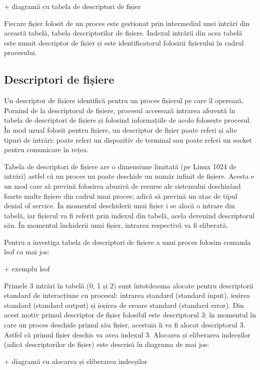 + diagramă cu tabela de descriptori de fișier

Fiecare fișier folosit de un proces este gestionat prin intermediul unei intrări
din această tabelă, tabela descriptorilor de fișiere. Indexul intrării din acea
tabelă este numit descriptor de fișier și este identificatorul folosirii
fișierului în cadrul procesului.

\subsection{Descriptori de fișiere}

Un descriptor de fișiere identifică pentru un proces fișierul pe care îl
operează. Pornind de la descriptorul de fișiere, procesul accesează intrarea
aferentă în tabela de descriptori de fișiere și folosind informațiile de acolo
folosește procesul. În mod uzual folosit pentru fișiere, un descriptor de fișier
poate referi și alte tipuri de intrări: poate referi un dispozitiv de terminal
sau poate referi un socket pentru comunicare în rețea.

Tabela de descriptori de fișiere are o dimensiune limitată (pe Linux 1024 de
intrări) astfel că un proces nu poate deschide un număr infinit de fișiere.
Acesta e un mod care să prevină folosirea abuzivă de resurse ale sistemului
deschizând foarte multe fișiere din cadrul unui proces; adică să prevină un atac
de tipul denial of service. În momentul deschiderii unui fișier i se alocă o
intrare din tabelă, iar fișierul va fi referit prin indexul din tabelă, acela
devenind descriptorul său. În momentul închiderii unui fișier, intrarea
respectivă va fi eliberată.

Pentru a investiga tabela de descriptori de fișiere a unui proces folosim
comanda lsof ca mai jos:

+ exemplu lsof

Primele 3 intrări în tabelă (0, 1 și 2) sunt întotdeauna alocate pentru
descriptorii standard de interacțiune cu procesul: intrarea standard (standard
input), ieșirea standard (standard output) și ieșirea de eroare standard
(standard error). Din acest motiv primul descriptor de fișier folosibil este
descriptorul 3; în momentul în care un proces deschide primul său fișier,
acestuia îi va fi alocat descriptorul 3. Astfel că primul fișier deschis va avea
indexul 3. Alocarea și eliberarea indecșilor (adică descriptorilor de fișier)
este descrisă în diagrama de mai jos:

+     diagramă cu alocarea și eliberarea indecșilor

